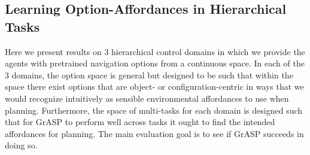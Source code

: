 \documentclass[nohyperref]{article}
\theoremstyle{plain}
\theoremstyle{definition}
\theoremstyle{remark}
\newcommand{\grasp}{{G}r{ASP} }
\newcommand{\cutsectiondown}{\vspace*{-0.03in}}
\begin{document}
\subsection{Learning Option-Affordances in Hierarchical Tasks~\label{sec:hrl_result}}
Here we present results on $3$ hierarchical control domains in which we provide the agents with  %
pretrained navigation options from a continuous space. In each of the $3$ domains, the option space is general but designed to be such that within the space there exist options that are object- or configuration-centric in ways that we would recognize intuitively as sensible environmental affordances to use when planning. Furthermore, the space of multi-tasks for each domain is designed such that for \grasp to perform well across tasks it ought to find the intended affordances for planning. The main evaluation goal is to see if \grasp succeeds in doing so.


\end{document}

